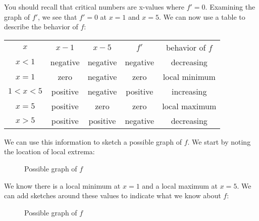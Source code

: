 You should recall that critical numbers are x-values where $f'=0$. Examining 
the graph of $f'$, we see that $f'=0$ at $x=1$ and $x=5$. We can now use a 
table to describe the behavior of $f$:

\begin{tabular}{c|c|c|c|c}
$x$ & $x-1$ & $x-5$ & $f'$ & behavior of $f$\\
$x<1$ & negative & negative & negative & decreasing\\
$x=1$ & zero & negative & zero & local minimum\\
$1<x<5$ & positive & negative & positive & increasing\\
$x=5$ & positive & zero & zero & local maximum\\
$x>5$ & positive & positive & negative & decreasing\\
\end{tabular}

We can use this information to sketch a possible graph of $f$. We start by 
noting the location of local extrema:
\begin{figure}[htbp]
	\centering
	\caption{Possible graph of $f$}
	\label{fig:sketchf2}
\end{figure}

We know there is a local minimum at $x=1$ and a local maximum at $x=5$. We can 
add sketches around these values to indicate what we know about $f$:
\begin{figure}[htbp]
	\centering
	\caption{Possible graph of $f$}
	\label{fig:sketchf3}
\end{figure}

